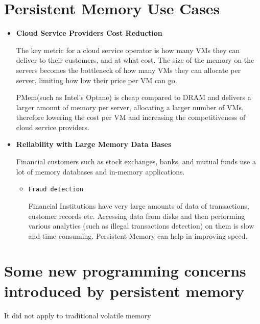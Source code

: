 \documentclass[11pt,swedish, openany, oneside]{book}
\begin{document}
\section{Persistent Memory Use Cases\cite{pmemuse}}
\begin{itemize}
    \item \textbf{Cloud Service Providers Cost Reduction}

    The key metric for a cloud service operator is how many VMs they can deliver to their customers, and at what cost. The size of the memory on the servers becomes the bottleneck of how many VMs they can allocate per server, limiting how low their price per VM can go. 
    
    PMem(such as Intel's Optane) is cheap compared to DRAM and  delivers a larger amount of memory per server, allocating a larger number of VMs, therefore lowering the cost per VM and increasing the competitiveness of cloud service providers.

    \item \textbf{Reliability with Large Memory Data Bases}
    
    Financial customers such as stock exchanges, banks, and mutual funds use a lot of memory databases and in-memory applications.
    \begin{itemize}
        \item \texttt{Fraud detection}
        
        Financial Institutions have very large amounts of data of transactions, customer records etc. Accessing data from disks and then performing various analytics (such as illegal transactions detection) on them is slow and time-consuming. Persistent Memory can help in improving speed.
    \end{itemize}
\end{itemize}

\section{Some new programming concerns introduced by persistent memory\cite{pmemdoc}}
It did not apply to traditional volatile memory
\end{document}
